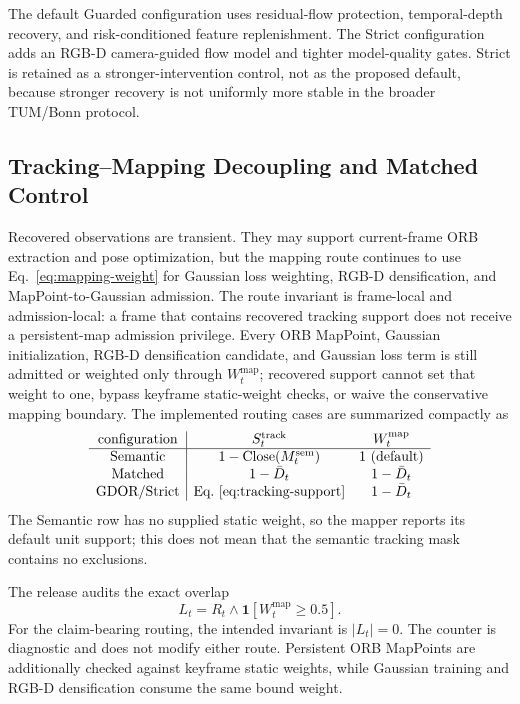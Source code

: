 The default Guarded configuration uses residual-flow protection, temporal-depth recovery, and risk-conditioned feature replenishment.
The Strict configuration adds an RGB-D camera-guided flow model and tighter model-quality gates.
Strict is retained as a stronger-intervention control, not as the proposed default, because stronger recovery is not uniformly more stable in the broader TUM/Bonn protocol.

\subsection{Tracking--Mapping Decoupling and Matched Control}

Recovered observations are transient.
They may support current-frame ORB extraction and pose optimization, but the mapping route continues to use Eq.~\eqref{eq:mapping-weight} for Gaussian loss weighting, RGB-D densification, and MapPoint-to-Gaussian admission.
The route invariant is frame-local and admission-local: a frame that contains recovered tracking support does not receive a persistent-map admission privilege.
Every ORB MapPoint, Gaussian initialization, RGB-D densification candidate, and Gaussian loss term is still admitted or weighted only through $W_t^{\mathrm{map}}$; recovered support cannot set that weight to one, bypass keyframe static-weight checks, or waive the conservative mapping boundary.
The implemented routing cases are summarized compactly as
\begin{equation}
\begin{array}{c|cc}
\text{configuration} & S_t^{\mathrm{track}} & W_t^{\mathrm{map}} \\
\hline
\text{Semantic} & 1-\operatorname{Close}(M_t^{\mathrm{sem}}) & 1\ \text{(default)} \\
\text{Matched} & 1-\bar D_t & 1-\bar D_t \\
\text{GDOR/Strict} & \text{Eq.~\eqref{eq:tracking-support}} & 1-\bar D_t
\end{array}
\label{eq:routing-matrix}
\end{equation}
The Semantic row has no supplied static weight, so the mapper reports its default unit support; this does not mean that the semantic tracking mask contains no exclusions.

The release audits the exact overlap
\begin{equation}
L_t=R_t\land\mathbf{1}[W_t^{\mathrm{map}}\ge0.5].
\label{eq:leak-audit}
\end{equation}
For the claim-bearing routing, the intended invariant is $|L_t|=0$.
The counter is diagnostic and does not modify either route.
Persistent ORB MapPoints are additionally checked against keyframe static weights, while Gaussian training and RGB-D densification consume the same bound weight.

